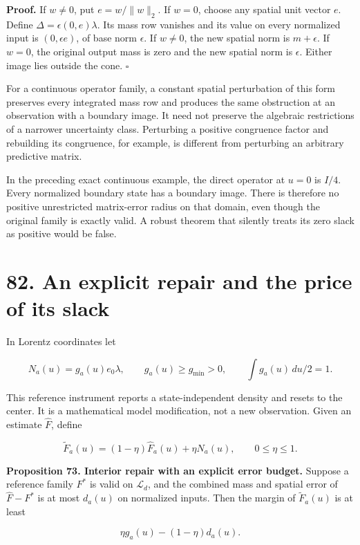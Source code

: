 \documentclass[11pt,letterpaper]{article}
\begin{document}
\textbf{Proof.} If \(w\ne0\), put \(e=w/\|w\|_2\). If \(w=0\), choose
any spatial unit vector \(e\). Define \(\Delta=\epsilon(0,e)\lambda\).
Its mass row vanishes and its value on every normalized input is
\((0,\epsilon e)\), of base norm \(\epsilon\). If \(w\ne0\), the new
spatial norm is \(m+\epsilon\). If \(w=0\), the original output mass is
zero and the new spatial norm is \(\epsilon\). Either image lies outside
the cone. \(\square\)

For a continuous operator family, a constant spatial perturbation of
this form preserves every integrated mass row and produces the same
obstruction at an observation with a boundary image. It need not
preserve the algebraic restrictions of a narrower uncertainty class.
Perturbing a positive congruence factor and rebuilding its congruence,
for example, is different from perturbing an arbitrary predictive
matrix.

In the preceding exact continuous example, the direct operator at
\(u=0\) is \(I/4\). Every normalized boundary state has a boundary
image. There is therefore no positive unrestricted matrix-error radius
on that domain, even though the original family is exactly valid. A
robust theorem that silently treats its zero slack as positive would be
false.

\section{82. An explicit repair and the price of its
slack}\label{an-explicit-repair-and-the-price-of-its-slack}

In Lorentz coordinates let

\[
N_a(u)=g_a(u)e_0\lambda,\qquad
 g_a(u)\geq g_{\min}>0,\qquad \int g_a(u)\,du/2=1.
\]

This reference instrument reports a state-independent density and resets
to the center. It is a mathematical model modification, not a new
observation. Given an estimate \(\widehat F\), define

\[
\widetilde F_a(u)=(1-\eta)\widehat F_a(u)+\eta N_a(u),
\qquad 0\leq\eta\leq1.
\]

\textbf{Proposition 73. Interior repair with an explicit error budget.}
Suppose a reference family \(F^*\) is valid on \(\mathcal L_d\), and the
combined mass and spatial error of \(\widehat F-F^*\) is at most
\(d_a(u)\) on normalized inputs. Then the margin of
\(\widetilde F_a(u)\) is at least

\[
\boxed{\eta g_a(u)-(1-\eta)d_a(u).}
\]
\end{document}

